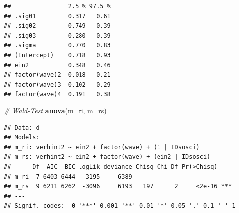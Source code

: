 \documentclass[
]{book}
\newenvironment{Shaded}{\begin{snugshade}}{\end{snugshade}}
\newcommand{\CommentTok}[1]{\textcolor[rgb]{0.56,0.35,0.01}{\textit{#1}}}
\newcommand{\DataTypeTok}[1]{\textcolor[rgb]{0.13,0.29,0.53}{#1}}
\newcommand{\DecValTok}[1]{\textcolor[rgb]{0.00,0.00,0.81}{#1}}
\newcommand{\FloatTok}[1]{\textcolor[rgb]{0.00,0.00,0.81}{#1}}
\newcommand{\KeywordTok}[1]{\textcolor[rgb]{0.13,0.29,0.53}{\textbf{#1}}}
\newcommand{\NormalTok}[1]{#1}
\newcommand{\OperatorTok}[1]{\textcolor[rgb]{0.81,0.36,0.00}{\textbf{#1}}}
\newcommand{\StringTok}[1]{\textcolor[rgb]{0.31,0.60,0.02}{#1}}
\begin{document}
\begin{verbatim}
##                2.5 % 97.5 %
## .sig01         0.317   0.61
## .sig02        -0.749  -0.39
## .sig03         0.280   0.39
## .sigma         0.770   0.83
## (Intercept)    0.718   0.93
## ein2           0.348   0.46
## factor(wave)2  0.018   0.21
## factor(wave)3  0.102   0.29
## factor(wave)4  0.191   0.38
\end{verbatim}

\begin{Shaded}
\begin{Highlighting}[]
\CommentTok{# Wald-Test}
\KeywordTok{anova}\NormalTok{(m_ri, m_rs)}
\end{Highlighting}
\end{Shaded}

\begin{verbatim}
## Data: d
## Models:
## m_ri: verhint2 ~ ein2 + factor(wave) + (1 | IDsosci)
## m_rs: verhint2 ~ ein2 + factor(wave) + (ein2 | IDsosci)
##      Df  AIC  BIC logLik deviance Chisq Chi Df Pr(>Chisq)    
## m_ri  7 6403 6444  -3195     6389                            
## m_rs  9 6211 6262  -3096     6193   197      2     <2e-16 ***
## ---
## Signif. codes:  0 '***' 0.001 '**' 0.01 '*' 0.05 '.' 0.1 ' ' 1
\end{verbatim}

\begin{Shaded}
\end{Shaded}
\end{document}
